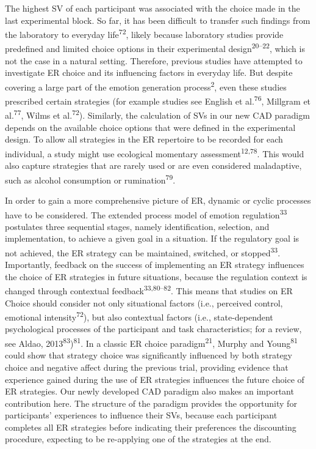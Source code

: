 \documentclass[
  man,floatsintext]{apa6}
\begin{document}
The highest SV of each participant was associated with the choice made in the last experimental block.
So far, it has been difficult to transfer such findings from the laboratory to everyday life\textsuperscript{72}, likely because laboratory studies provide predefined and limited choice options in their experimental design\textsuperscript{20--22}, which is not the case in a natural setting.
Therefore, previous studies have attempted to investigate ER choice and its influencing factors in everyday life.
But despite covering a large part of the emotion generation process\textsuperscript{2}, even these studies prescribed certain strategies (for example studies see English et al.\textsuperscript{76}, Millgram et al.\textsuperscript{77}, Wilms et al.\textsuperscript{72}).
Similarly, the calculation of SVs in our new CAD paradigm depends on the available choice options that were defined in the experimental design.
To allow all strategies in the ER repertoire to be recorded for each individual, a study might use ecological momentary assessment\textsuperscript{12,78}.
This would also capture strategies that are rarely used or are even considered maladaptive, such as alcohol consumption or rumination\textsuperscript{79}.

In order to gain a more comprehensive picture of ER, dynamic or cyclic processes have to be considered.
The extended process model of emotion regulation\textsuperscript{33} postulates three sequential stages, namely identification, selection, and implementation, to achieve a given goal in a situation.
If the regulatory goal is not achieved, the ER strategy can be maintained, switched, or stopped\textsuperscript{33}.
Importantly, feedback on the success of implementing an ER strategy influences the choice of ER strategies in future situations, because the regulation context is changed through contextual feedback\textsuperscript{33,80--82}.
This means that studies on ER Choice should consider not only situational factors (i.e., perceived control, emotional intensity\textsuperscript{72}), but also contextual factors (i.e., state-dependent psychological processes of the participant and task characteristics; for a review, see Aldao, 2013\textsuperscript{83})\textsuperscript{81}.
In a classic ER choice paradigm\textsuperscript{21}, Murphy and Young\textsuperscript{81} could show that strategy choice was significantly influenced by both strategy choice and negative affect during the previous trial, providing evidence that experience gained during the use of ER strategies influences the future choice of ER strategies.
Our newly developed CAD paradigm also makes an important contribution here.
The structure of the paradigm provides the opportunity for participants' experiences to influence their SVs, because each participant completes all ER strategies before indicating their preferences the discounting procedure, expecting to be re-applying one of the strategies at the end.
\end{document}
